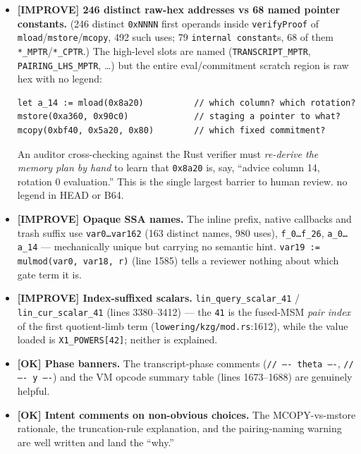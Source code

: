 \begin{itemize}
  \item \textcolor{codegenblue}{\textbf{[IMPROVE] 246 distinct raw-hex
        addresses vs 68 named pointer constants.}} (246 distinct
        \texttt{0xNNNN} first operands inside \texttt{verifyProof} of
        \texttt{mload}/\texttt{mstore}/\texttt{mcopy}, 492 such uses; 79
        \texttt{internal constant}s, 68 of them \texttt{*\_MPTR}/\texttt{*\_CPTR}.)
        The high-level slots are named
        (\texttt{TRANSCRIPT\_MPTR}, \texttt{PAIRING\_\allowbreak{}LHS\_\allowbreak{}MPTR},
        \ldots) but the entire eval/commitment scratch region is raw hex
        with no legend:
\begin{lstlisting}[style=yul]
let a_14 := mload(0x8a20)          // which column? which rotation?
mstore(0xa360, 0x90c0)             // staging a pointer to what?
mcopy(0xbf40, 0x5a20, 0x80)        // which fixed commitment?
\end{lstlisting}
        An auditor cross-checking against the Rust verifier must
        \emph{re-derive the memory plan by hand} to learn that
        \texttt{0x8a20} is, say, ``advice column 14, rotation 0
        evaluation.'' This is the single largest barrier to human review.
         no legend in HEAD or B64.
  \item \textcolor{codegenblue}{\textbf{[IMPROVE] Opaque SSA names.}}
        The inline prefix, native callbacks and trash suffix use
        \texttt{var0\ldots var162} (163 distinct names, 980 uses),
        \texttt{f\_0\ldots f\_26}, \texttt{a\_0\ldots a\_14} ---
        mechanically unique but carrying no
        semantic hint. \texttt{var19 := mulmod(var0, var18, r)} (line
        1585) tells a reviewer nothing about which gate term it is.
  \item \textcolor{codegenblue}{\textbf{[IMPROVE] Index-suffixed
        scalars.}} \texttt{lin\_\allowbreak{}query\_\allowbreak{}scalar\_\allowbreak{}41} /
        \texttt{lin\_\allowbreak{}cur\_\allowbreak{}scalar\_\allowbreak{}41} (lines 3380--3412) --- the
        \texttt{41} is the fused-MSM \emph{pair index} of the first
        quotient-limb term (\texttt{lowering/\allowbreak{}kzg/\allowbreak{}mod.rs}:1612), while the value
        loaded is \texttt{X1\_POWERS[42]}; neither is explained.
  \item \textcolor{tracegreen}{\textbf{[OK] Phase banners.}} The
        transcript-phase comments (\texttt{/\allowbreak{}/\allowbreak{} ---- theta ----},
        \texttt{// ---- y ----}) and the VM opcode summary table
        (lines 1673--1688) are genuinely helpful.
  \item \textcolor{tracegreen}{\textbf{[OK] Intent comments on
        non-obvious choices.}} The MCOPY-vs-mstore rationale, the
        truncation-rule explanation, and the pairing-naming warning are
        well written and land the ``why.''
\end{itemize}

